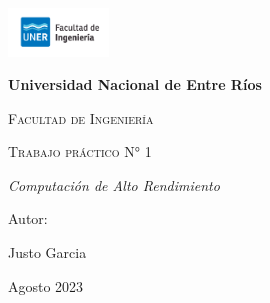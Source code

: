 
\begin{titlepage}
    \centering
    {\includegraphics[width=0.2\textwidth]{Images/fiuner.png}\par}
    \vspace{1cm}
    {\bfseries\LARGE Universidad Nacional de Entre Ríos \par}
    \vspace{1cm}
    {\scshape\Large Facultad de Ingeniería \par}
    \vspace{3cm}
    {\scshape\Huge Trabajo práctico N° 1\par}
    \vspace{0.5cm}
    {\itshape\Large Computación de Alto Rendimiento \par}
    \vfill
    {\Large Autor: \par}
    {\Large Justo Garcia \par}
    \vfill
    {\Large Agosto 2023 \par}
\end{titlepage}